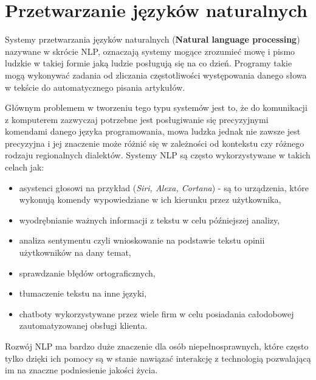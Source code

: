 
\chapter{Przetwarzanie języków naturalnych}
Systemy przetwarzania języków naturalnych (\textbf{Natural language processing}) nazywane 
w skrócie NLP, oznaczają systemy mogące zrozumieć mowę i pismo ludzkie w takiej
formie jaką ludzie posługują się na co dzień. Programy takie mogą wykonywać zadania od zliczania
częstotliwości występowania danego słowa w tekście do automatycznego pisania artykułów. 

Głównym problemem w tworzeniu tego typu systemów jest to, że do komunikacji z komputerem zazwyczaj
potrzebne jest posługiwanie się precyzyjnymi komendami danego języka programowania, mowa ludzka
jednak nie zawsze jest precyzyjna i jej znaczenie może różnić się w zależności od kontekstu czy
różnego rodzaju regionalnych dialektów. Systemy NLP są często wykorzystywane w takich 
celach jak:
\begin{itemize}
    \item asystenci głosowi na przykład (\textit{Siri, Alexa, Cortana}) - są to urządzenia, które 
    wykonują komendy wypowiedziane w ich kierunku przez użytkownika,
    \item wyodrębnianie ważnych informacji z tekstu w celu późniejszej analizy,
    \item analiza sentymentu czyli wnioskowanie na podstawie tekstu opinii użytkowników na dany temat,
    \item sprawdzanie błędów ortograficznych,
    \item tłumaczenie tekstu na inne języki,
    \item chatboty wykorzystywane przez wiele firm w celu posiadania całodobowej zautomatyzowanej obsługi klienta.
\end{itemize}
Rozwój NLP ma bardzo duże znaczenie dla osób niepełnosprawnych, które często tylko dzięki ich pomocy są 
w stanie nawiązać interakcję z technologią pozwalającą im na znaczne podniesienie jakości życia. ~\cite{TextProcessing}
